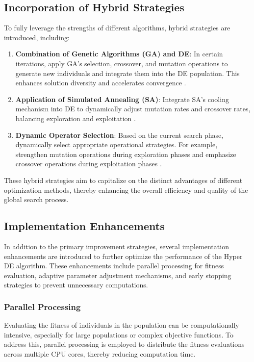 \documentclass[conference]{IEEEtran}
\begin{document}
\subsection{Incorporation of Hybrid Strategies}

To fully leverage the strengths of different algorithms, hybrid strategies are introduced, including:

\begin{enumerate}
    \item \textbf{Combination of Genetic Algorithms (GA) and DE}: In certain iterations, apply GA's selection, crossover, and mutation operations to generate new individuals and integrate them into the DE population. This enhances solution diversity and accelerates convergence \cite{grobler2010alternative}.
    \item \textbf{Application of Simulated Annealing (SA)}: Integrate SA's cooling mechanism into DE to dynamically adjust mutation rates and crossover rates, balancing exploration and exploitation \cite{grobler2010alternative}.
    \item \textbf{Dynamic Operator Selection}: Based on the current search phase, dynamically select appropriate operational strategies. For example, strengthen mutation operations during exploration phases and emphasize crossover operations during exploitation phases \cite{grobler2010alternative}.
\end{enumerate}

These hybrid strategies aim to capitalize on the distinct advantages of different optimization methods, thereby enhancing the overall efficiency and quality of the global search process.

\subsection{Implementation Enhancements}

In addition to the primary improvement strategies, several implementation enhancements are introduced to further optimize the performance of the Hyper DE algorithm. These enhancements include parallel processing for fitness evaluation, adaptive parameter adjustment mechanisms, and early stopping strategies to prevent unnecessary computations.

\subsubsection{Parallel Processing}

Evaluating the fitness of individuals in the population can be computationally intensive, especially for large populations or complex objective functions. To address this, parallel processing is employed to distribute the fitness evaluations across multiple CPU cores, thereby reducing computation time.
\end{document}
